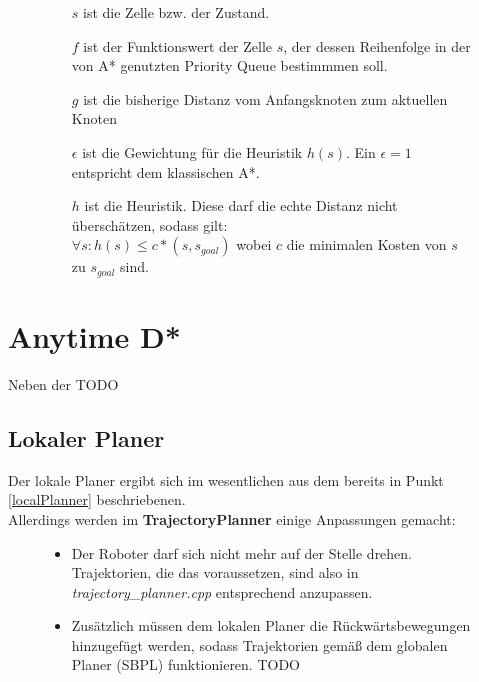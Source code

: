 \documentclass[oribibl]{llncs}
\begin{document}
\begin{figure}
\begin{itemize}
\item [$s$] ist die Zelle bzw. der Zustand.
\item [$f$] ist der Funktionswert der Zelle $s$, der dessen Reihenfolge in der von A* genutzten Priority Queue bestimmmen soll.
\item [$g$] ist die bisherige Distanz vom Anfangsknoten zum aktuellen Knoten
\item [$\epsilon$] ist die Gewichtung für die Heuristik $h(s)$. Ein $\epsilon = 1$ entspricht dem klassischen A*.
\item [$h$] ist die Heuristik. Diese darf die echte Distanz nicht überschätzen, sodass gilt:\\
$\forall s: h(s) \le c*(s,s_{goal})$ wobei $c$ die minimalen Kosten von $s$ zu $s_{goal}$ sind.
\end{itemize}
\end{figure}
\section{Anytime D*}
Neben der TODO



\subsection{Lokaler Planer}
Der lokale Planer ergibt sich im wesentlichen aus dem bereits in Punkt \ref{localPlanner} beschriebenen.\\
Allerdings werden im \textbf{TrajectoryPlanner} einige Anpassungen gemacht:
\begin{figure}
\begin{itemize}
\item Der Roboter darf sich nicht mehr auf der Stelle drehen. Trajektorien, die das voraussetzen, sind also in \textit{trajectory\_planner.cpp} entsprechend anzupassen.
\item Zusätzlich müssen dem lokalen Planer die Rückwärtsbewegungen hinzugefügt werden, sodass Trajektorien gemäß dem globalen Planer (SBPL) funktionieren. TODO
\end{itemize}
\end{figure}
\end{document}
